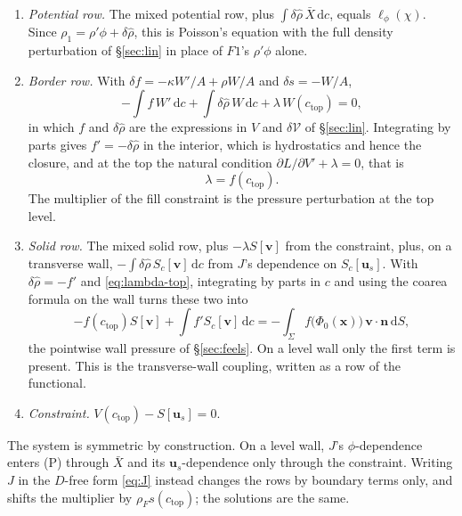\documentclass[11pt]{article}
\theoremstyle{definition}
\theoremstyle{remark}
\newcommand{\bu}{\mathbf{u}}
\newcommand{\bv}{\mathbf{v}}
\newcommand{\bn}{\mathbf{n}}
\newcommand{\bx}{\mathbf{x}}
\newcommand{\dS}{\,\mathrm{d}S}
\newcommand{\dc}{\,\mathrm{d}c}
\newcommand{\Vol}{\mathcal V}
\begin{document}
\begin{enumerate}
\item[(P)] \emph{Potential row.} The mixed potential row, plus
  $\int\delta\hat\rho\,\bar X\dc$, equals $\ell_\phi(\chi)$. Since
  $\rho_1 = \rho'\phi + \delta\hat\rho$, this is Poisson's equation with
  the full density perturbation of \S\ref{sec:lin} in place of $F1$'s
  $\rho'\phi$ alone.
\item[(V)] \emph{Border row.} With $\delta f = -\kappa W'/A + \rho W/A$
  and $\delta s = -W/A$,
  \begin{equation*}
    -\int f\,W'\dc + \int\delta\hat\rho\,W\dc + \lambda\,W(c_{\mathrm{top}}) = 0 ,
  \end{equation*}
  in which $f$ and $\delta\hat\rho$ are the expressions in $V$ and
  $\delta\Vol$ of \S\ref{sec:lin}. Integrating by parts gives $f' =
  -\delta\hat\rho$ in the interior, which is hydrostatics and hence the
  closure, and at the top the natural condition $\partial L/\partial V'
  + \lambda = 0$, that is
  \begin{equation}
    \lambda = f(c_{\mathrm{top}}) .
    \label{eq:lambda-top}
  \end{equation}
  The multiplier of the fill constraint is the pressure perturbation at
  the top level.
\item[(S)] \emph{Solid row.} The mixed solid row, plus $-\lambda S[\bv]$
  from the constraint, plus, on a transverse wall, $-\int\delta\hat\rho\,
  S_c[\bv]\dc$ from $J$'s dependence on $S_c[\bu_s]$. With $\delta\hat\rho
  = -f'$ and \eqref{eq:lambda-top}, integrating by parts in $c$ and using
  the coarea formula on the wall turns these two into
  \begin{equation*}
    -f(c_{\mathrm{top}})S[\bv] + \int f'S_c[\bv]\dc
    = -\int_\Sigma f\bigl(\Phi_0(\bx)\bigr)\,\bv\cdot\bn\dS ,
  \end{equation*}
  the pointwise wall pressure of \S\ref{sec:feels}. On a level wall only
  the first term is present. This is the transverse-wall coupling,
  written as a row of the functional.
\item[(C)] \emph{Constraint.} $V(c_{\mathrm{top}}) - S[\bu_s] = 0$.
\end{enumerate}
The system is symmetric by construction. On a level wall, $J$'s
$\phi$-dependence enters (P) through $\bar X$ and its $\bu_s$-dependence
only through the constraint. Writing $J$ in the $D$-free form
\eqref{eq:J} instead changes the rows by boundary terms only, and shifts
the multiplier by $\rho_Fs(c_{\mathrm{top}})$; the solutions are the
same.
\end{document}
